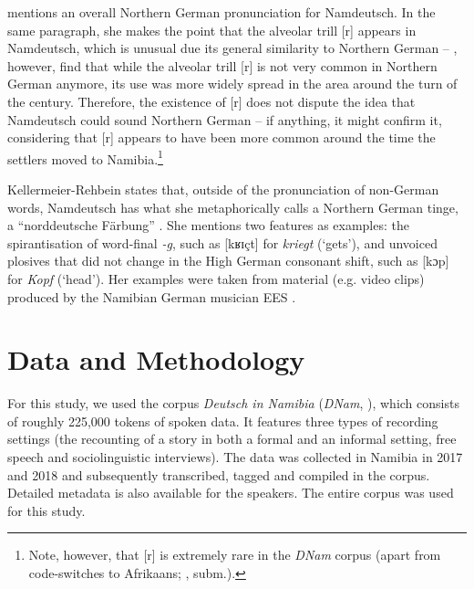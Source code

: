 \documentclass[output=paper]{langsci/langscibook}
\begin{document}
\citet[114]{riehl_sprachkontaktforschung_2004} mentions an overall Northern German pronunciation for Namdeutsch. In the same paragraph, she makes the point that the alveolar trill [r] appears in Namdeutsch, which is unusual due its general similarity to Northern German -- \citet[301]{elmentaler_norddeutscher_2015}, however, find that while the alveolar trill [r] is not very common in Northern German anymore, its use was more widely spread in the area around the turn of the century. Therefore, the existence of [r] does not dispute the idea that Namdeutsch could sound Northern German – if anything, it might confirm it, considering that [r] appears to have been more common around the time the settlers moved to Namibia.\footnote{Note, however, that [r] is extremely rare in the \textit{DNam} corpus (apart from code-switches to Afrikaans; \citealt{zimmer_sprachliche_nodate}, subm.).}

Kellermeier-Rehbein states that, outside of the pronunciation of non-German words, Namdeutsch has what she metaphorically calls a Northern German tinge, a “norddeutsche Färbung” \citep[49]{kellermeier-rehbein_namslang_2015}. She mentions two features as examples: the spirantisation of word-final \textit{-g}, such as [kʁɪçt] for \textit{kriegt} (‘gets’), and unvoiced plosives that did not change in the High German consonant shift, such as [kɔp] for \textit{Kopf} (‘head’). Her examples were taken from material (e.g. video clips) produced by the Namibian German musician EES \citep[48]{kellermeier-rehbein_namslang_2015}.

\section{Data and Methodology}
\label{sec:stuhl:3}

For this study, we used the corpus \textit{Deutsch in Namibia} (\textit{DNam}, \citealt{zimmer_korpus_2020}), which consists of roughly 225,000 tokens of spoken data. It features three types of recording settings (the recounting of a story in both a formal and an informal setting, free speech and sociolinguistic interviews). The data was collected in Namibia in 2017 and 2018 and subsequently transcribed, tagged and compiled in the corpus. Detailed metadata is also available for the speakers. The entire corpus was used for this study. 
\end{document}
